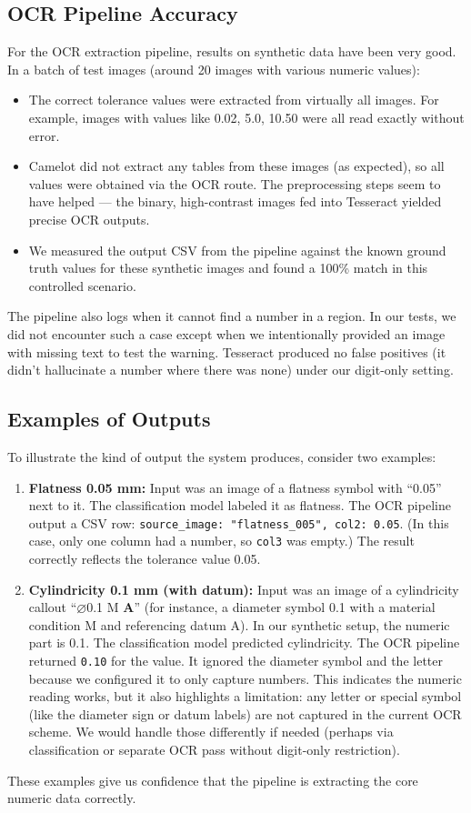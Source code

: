 \documentclass[11pt,a4paper]{article}
\begin{document}
\subsection*{OCR Pipeline Accuracy}
For the OCR extraction pipeline, results on synthetic data have been very good. In a batch of test images (around 20 images with various numeric values):
\begin{itemize}
  \item The correct tolerance values were extracted from virtually all images. For example, images with values like 0.02, 5.0, 10.50 were all read exactly without error.
  \item Camelot did not extract any tables from these images (as expected), so all values were obtained via the OCR route. The preprocessing steps seem to have helped — the binary, high-contrast images fed into Tesseract yielded precise OCR outputs.
  \item We measured the output CSV from the pipeline against the known ground truth values for these synthetic images and found a 100\% match in this controlled scenario.
\end{itemize}
The pipeline also logs when it cannot find a number in a region. In our tests, we did not encounter such a case except when we intentionally provided an image with missing text to test the warning. Tesseract produced no false positives (it didn’t hallucinate a number where there was none) under our digit-only setting.

\subsection*{Examples of Outputs}
To illustrate the kind of output the system produces, consider two examples:
\begin{enumerate}
  \item \textbf{Flatness 0.05 mm:} Input was an image of a flatness symbol with “0.05” next to it. The classification model labeled it as flatness. The OCR pipeline output a CSV row: \verb|source_image: "flatness_005", col2: 0.05|. (In this case, only one column had a number, so \verb|col3| was empty.) The result correctly reflects the tolerance value 0.05.
\item \textbf{Cylindricity 0.1 mm (with datum):} Input was an image of a cylindricity callout “⌀0.1 M \textbf{A}” (for instance, a diameter symbol 0.1 with a material condition M and referencing datum A). In our synthetic setup, the numeric part is 0.1. The classification model predicted cylindricity. The OCR pipeline returned \verb|0.10| for the value. It ignored the diameter symbol and the letter because we configured it to only capture numbers. This indicates the numeric reading works, but it also highlights a limitation: any letter or special symbol (like the diameter sign or datum labels) are not captured in the current OCR scheme. We would handle those differently if needed (perhaps via classification or separate OCR pass without digit-only restriction).
\end{enumerate}
These examples give us confidence that the pipeline is extracting the core numeric data correctly.
\end{document}
